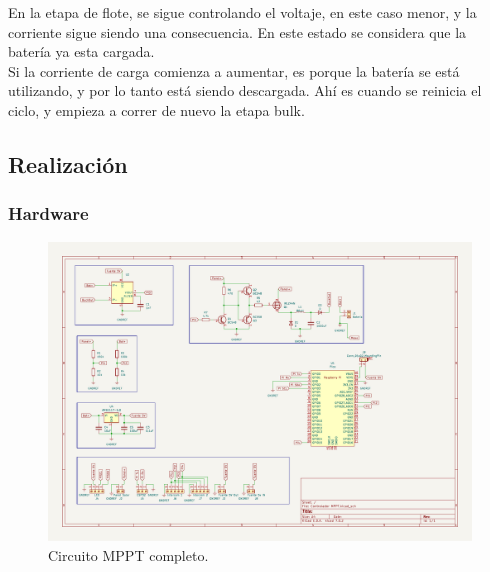 En la etapa de flote, se sigue controlando el voltaje, en este caso menor, y la corriente sigue siendo una consecuencia. En este estado se considera que la batería ya esta cargada.\\

Si la corriente de carga comienza a aumentar, es porque la batería se está utilizando, y por lo tanto está siendo descargada. Ahí es cuando se reinicia el ciclo, y empieza a correr de nuevo la etapa bulk.\\

\subsection{Realización}

\subsubsection{Hardware}

\begin{figure}[H]
    \centering
    \includegraphics[width=1\linewidth]{MPPT/Controlador MPPT.pdf}
    \caption{Circuito MPPT completo.}
    \label{fig:enter-label}
\end{figure}

